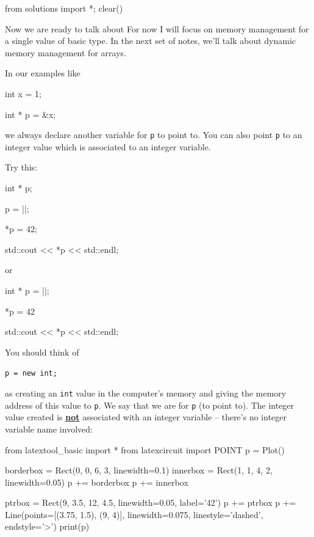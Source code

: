\begin{python0}
from solutions import *; clear()
\end{python0}

Now we are ready to talk about  For now I will focus on memory management for a single value of basic type. In the next set of notes, we'll talk about dynamic memory management for arrays.

In our examples like

\begin{consolethree}[escapeinside=||]
int x = 1;

int * p = &x;
\end{consolethree}

we always declare another variable for \texttt{p} to point to. You can also point \texttt{p} to an integer value which is  associated to an integer variable.

Try this:

\begin{consolethree}[escapeinside=||]
int * p;

p = ||;

*p = 42;

std::cout << *p << std::endl;
\end{consolethree}
or

\begin{consolethree}[escapeinside=||]
int * p = ||;

*p = 42

std::cout << *p << std::endl;
\end{consolethree}
You should think of
\begin{center}
\texttt{p = new int;}
\end{center}
as creating an \texttt{int} value  in the computer's memory and giving the memory address of this value to \texttt{p}. We say that we are  for \texttt{p} (to point to). The integer value created is \underline{\textbf{not}} associated with an integer variable -- there's no integer variable name involved:

\begin{python}
from latextool_basic import *
from latexcircuit import POINT
p = Plot()

borderbox = Rect(0, 0, 6, 3, linewidth=0.1)
innerbox = Rect(1, 1, 4, 2, linewidth=0.05)
p += borderbox
p += innerbox

ptrbox = Rect(9, 3.5, 12, 4.5, linewidth=0.05, label='42')
p += ptrbox
p += Line(points=[(3.75, 1.5), (9, 4)], linewidth=0.075, linestyle='dashed', endstyle='>')
print(p)
\end{python}

